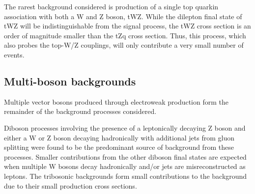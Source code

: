 The rarest background considered is production of a single top quarkin association with both a W and Z boson, tWZ.
While the dilepton final state of tWZ will be indistinguishable from the signal process, the tWZ cross section is an order of magnitude smaller than the tZq cross section.
Thus, this process, which also probes the top-W/Z couplings, will only contribute a very small number of events.

\subsection{Multi-boson backgrounds}
Multiple vector bosons produced through electroweak production form the remainder of the background processes considered.

Diboson processes involving the presence of a leptonically decaying Z boson and either a W or Z boson decaying hadronically with additional jets from gluon splitting were found to be the predominant source of background from these processes.
Smaller contributions from the other diboson final states are expected when multiple W bosons decay hadronically and/or jets are misreconstructed as leptons.
The tribosonic backgrounds form small contributions to the background due to their small production cross sections.